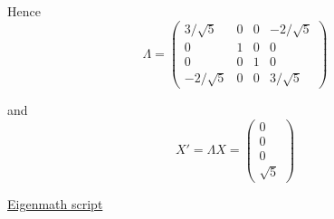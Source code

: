 Hence
\begin{equation*}
\Lambda=\begin{pmatrix}
3/\sqrt5 & 0 & 0 & -2/\sqrt5
\\
0 & 1 & 0 & 0
\\
0 & 0 & 1 & 0
\\
-2/\sqrt5 & 0 & 0 & 3/\sqrt5
\end{pmatrix}
\end{equation*}

and
\begin{equation*}
X'=\Lambda X=\begin{pmatrix}0\\0\\0\\\sqrt5\end{pmatrix}
\end{equation*}

\href{https://georgeweigt.github.io/examples/lorentz-invariance-demo.html}{Eigenmath script}


